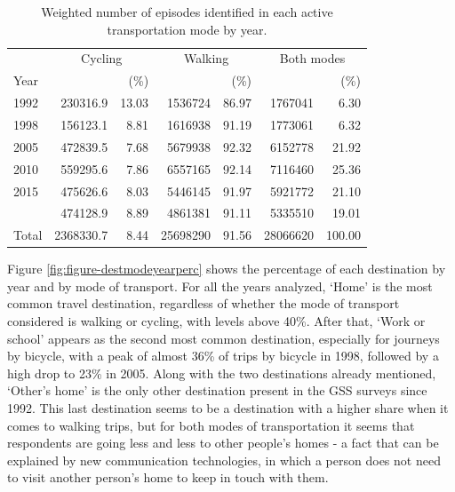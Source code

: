\documentclass[preprint, 3p,
authoryear]{elsarticle} %
\begin{document}
\begin{table}
\centering
\caption{\label{tab:bulding table-01}\label{tab:episodes-count-percentages}Weighted number of episodes identified in each active transportation mode by year.}
\centering
\fontsize{10}{12}\selectfont
\begin{tabular}[t]{lrrrrrr}
\toprule
\multicolumn{1}{c}{ } & \multicolumn{2}{c}{Cycling} & \multicolumn{2}{c}{Walking} & \multicolumn{2}{c}{Both modes} \\
\cmidrule(l{3pt}r{3pt}){2-3} \cmidrule(l{3pt}r{3pt}){4-5} \cmidrule(l{3pt}r{3pt}){6-7}
Year &  & (\%) &  & (\%) &  & (\%)\\
\midrule
1992 & 230316.9 & 13.03 & 1536724 & 86.97 & 1767041 & 6.30\\
1998 & 156123.1 & 8.81 & 1616938 & 91.19 & 1773061 & 6.32\\
2005 & 472839.5 & 7.68 & 5679938 & 92.32 & 6152778 & 21.92\\
2010 & 559295.6 & 7.86 & 6557165 & 92.14 & 7116460 & 25.36\\
2015 & 475626.6 & 8.03 & 5446145 & 91.97 & 5921772 & 21.10\\
\addlinespace
2022 & 474128.9 & 8.89 & 4861381 & 91.11 & 5335510 & 19.01\\
Total & 2368330.7 & 8.44 & 25698290 & 91.56 & 28066620 & 100.00\\
\bottomrule
\end{tabular}
\end{table}

Figure \ref{fig:figure-destmodeyearperc} shows the percentage of each
destination by year and by mode of transport. For all the years
analyzed, `Home' is the most common travel destination, regardless of
whether the mode of transport considered is walking or cycling, with
levels above 40\%. After that, `Work or school' appears as the second
most common destination, especially for journeys by bicycle, with a peak
of almost 36\% of trips by bicycle in 1998, followed by a high drop to
23\% in 2005. Along with the two destinations already mentioned,
`Other's home' is the only other destination present in the GSS surveys
since 1992. This last destination seems to be a destination with a
higher share when it comes to walking trips, but for both modes of
transportation it seems that respondents are going less and less to
other people's homes - a fact that can be explained by new communication
technologies, in which a person does not need to visit another person's
home to keep in touch with them.
\end{document}
